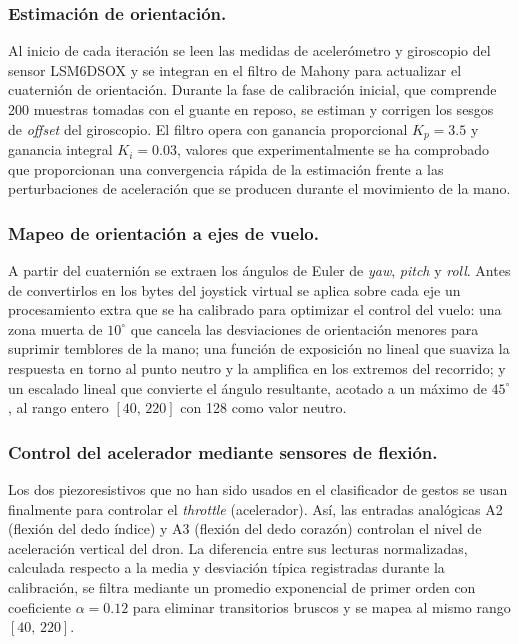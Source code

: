 \documentclass[12pt]{article}
\begin{document}
\subsubsection{Estimación de orientación.} Al inicio de cada iteración se leen las medidas de acelerómetro y giroscopio del sensor LSM6DSOX y se integran en el filtro de Mahony para actualizar el cuaternión de orientación. Durante la fase de calibración inicial, que comprende 200 muestras tomadas con el guante en reposo, se estiman y corrigen los sesgos de \textit{offset} del giroscopio. El filtro opera con ganancia proporcional $K_p = 3{.}5$ y ganancia integral $K_i = 0{.}03$, valores que experimentalmente se ha comprobado que proporcionan una convergencia rápida de la estimación frente a las perturbaciones de aceleración que se producen durante el movimiento de la mano.

\subsubsection{Mapeo de orientación a ejes de vuelo.}
A partir del cuaternión se extraen los ángulos de Euler de \textit{yaw}, \textit{pitch} y \textit{roll}. Antes de convertirlos en los bytes del joystick virtual se aplica sobre cada eje un procesamiento extra que se ha calibrado para optimizar el control del vuelo: una zona muerta de $10^\circ$ que cancela las desviaciones de orientación menores para suprimir temblores de la mano; una función de exposición no lineal que suaviza la respuesta en torno al punto neutro y la amplifica en los extremos del recorrido; y un escalado lineal que convierte el ángulo resultante, acotado a un máximo de $45^\circ$, al rango entero $[40,\,220]$ con 128 como valor neutro.

\subsubsection{Control del acelerador mediante sensores de flexión.}
Los dos piezoresistivos que no han sido usados en el clasificador de gestos se usan finalmente para controlar el \textit{throttle} (acelerador). Así, las entradas analógicas A2 (flexión del dedo índice) y A3 (flexión del dedo corazón) controlan el nivel de aceleración vertical del dron. La diferencia entre sus lecturas normalizadas, calculada respecto a la media y desviación típica registradas durante la calibración, se filtra mediante un promedio exponencial de primer orden con coeficiente $\alpha = 0{.}12$ para eliminar transitorios bruscos y se mapea al mismo rango $[40,\,220]$.
\end{document}
